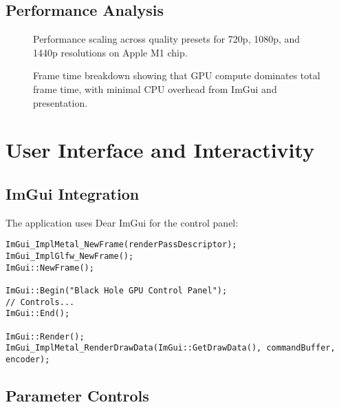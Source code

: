 \documentclass[12pt,a4paper]{article}
\theoremstyle{definition}
\theoremstyle{remark}
\begin{document}
\subsection{Performance Analysis}

\begin{figure}[H]
    \centering
    \caption{Performance scaling across quality presets for 720p, 1080p, and 1440p resolutions on Apple M1 chip.}
    \label{fig:performance_scaling}
\end{figure}

\begin{figure}[H]
    \centering
    \caption{Frame time breakdown showing that GPU compute dominates total frame time, with minimal CPU overhead from ImGui and presentation.}
    \label{fig:frame_time_breakdown}
\end{figure}

\section{User Interface and Interactivity}

\subsection{ImGui Integration}

The application uses Dear ImGui for the control panel:

\begin{lstlisting}[style=metalstyle, caption=ImGui window setup]
ImGui_ImplMetal_NewFrame(renderPassDescriptor);
ImGui_ImplGlfw_NewFrame();
ImGui::NewFrame();

ImGui::Begin("Black Hole GPU Control Panel");
// Controls...
ImGui::End();

ImGui::Render();
ImGui_ImplMetal_RenderDrawData(ImGui::GetDrawData(), commandBuffer, encoder);
\end{lstlisting}

\subsection{Parameter Controls}
\end{document}
